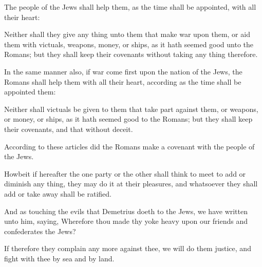 {\par }{\PP {}The people of the Jews shall help them, as the time shall be appointed, with all their heart:
\par }{\PP {}Neither shall they give any thing unto them that make war upon them, or aid them with victuals, weapons, money, or ships, as it hath seemed good unto the Romans; but they shall keep their covenants without taking any thing therefore.
\par }{\PP {}In the same manner also, if war come first upon the nation of the Jews, the Romans shall help them with all their heart, according as the time shall be appointed them:
\par }{\PP {}Neither shall victuals be given to them that take part against them, or weapons, or money, or ships, as it hath seemed good to the Romans; but they shall keep their covenants, and that without deceit.
\par }{\PP {}According to these articles did the Romans make a covenant with the people of the Jews.
\par }{\PP {}Howbeit if hereafter the one party or the other shall think to meet to add or diminish any thing, they may do it at their pleasures, and whatsoever they shall add or take away shall be ratified.
\par }{\PP {}And as touching the evils that Demetrius doeth to the Jews, we have written unto him, saying, Wherefore thou made thy yoke heavy upon our friends and confederates the Jews?
\par }{\PP {}If therefore they complain any more against thee, we will do them justice, and fight with thee by sea and by land.

}

